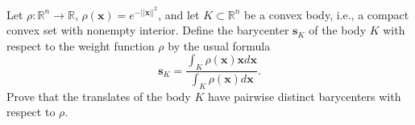 Let $\rho:\mathbb{R}^n\to \mathbb{R}$, $\rho(\mathbf{x})=e^{-||\mathbf{x}||^2}$, and let $K\subset \mathbb{R}^n$ be a convex body, i.e., a compact convex set with nonempty interior. Define the barycenter $\mathbf{s}_K$ of the body $K$ with respect to the weight function $\rho$ by the usual formula
\[\mathbf{s}_K=\frac{\int_K\rho(\mathbf{x})\mathbf{x}d\mathbf{x}}{\int_K\rho(\mathbf{x})d\mathbf{x}}.\]
Prove that the translates of the body $K$ have pairwise distinct barycenters with respect to $\rho$.